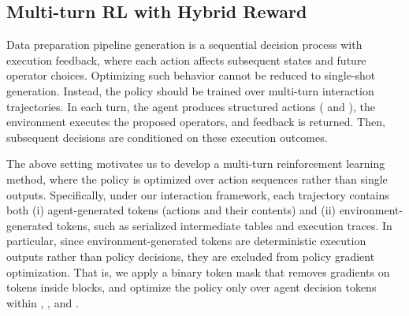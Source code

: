 
\subsection{Multi-turn RL with Hybrid Reward}
\label{subsec:rl_reward}

Data preparation pipeline generation is a sequential decision process with execution feedback, where each action affects subsequent states and future operator choices. Optimizing such behavior cannot be reduced to single-shot generation. Instead, the policy should be trained over multi-turn interaction trajectories. In each turn, the agent produces structured actions (\eg {} and ), the environment executes the proposed operators, and feedback is returned. Then, subsequent decisions are conditioned on these execution outcomes. 

The above setting motivates us to develop a multi-turn reinforcement learning method, where the policy is optimized over action sequences rather than single outputs. 
Specifically, under our interaction framework, each trajectory contains both (i) agent-generated tokens (actions and their contents) and (ii) environment-generated tokens, such as serialized intermediate tables and execution traces. In particular, since environment-generated tokens are deterministic execution outputs rather than policy decisions, they are excluded from policy gradient optimization. That is, we apply a binary token mask that removes gradients on tokens inside  blocks, and optimize the policy only over agent decision tokens within , , and .

